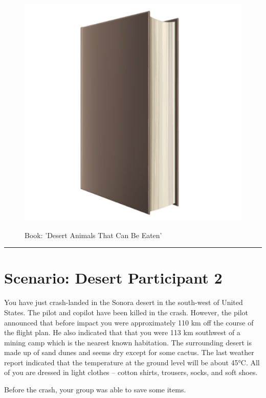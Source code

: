 \documentclass{article}
\begin{document}
    \begin{figure}[H]
        \centering
        \begin{minipage}{0.25\textwidth}
            \centering
            \includegraphics[width=\textwidth]{../SurvivalItemImages/book}
        \end{minipage}\hfill
        \begin{minipage}{0.7\textwidth}
            \centering
            \Large Book: 'Desert Animals That Can Be Eaten'
        \end{minipage}
    \end{figure}
    \vspace{-0.8em}
    \noindent\rule{\textwidth}{0.4pt}
            
    \clearpage
    \section*{Scenario: \textmd{Desert} \hfill Participant \textmd{2}}
    \Large You have just crash-landed in the Sonora desert in the south-west of United States. The pilot and copilot have been killed in the crash. However, the pilot announced that before impact you were approximately 110 km off the course of the flight plan. He also indicated that that you were 113 km southwest of a mining camp which is the nearest known habitation. The surrounding desert is made up of sand dunes and seems dry except for some cactus. The last weather report indicated that the temperature at the ground level will be about 45°C. All of you are dressed in light clothes – cotton shirts, trousers, socks, and soft shoes. 

Before the crash, your group was able to save some items.\clearpage
        
\end{document}
